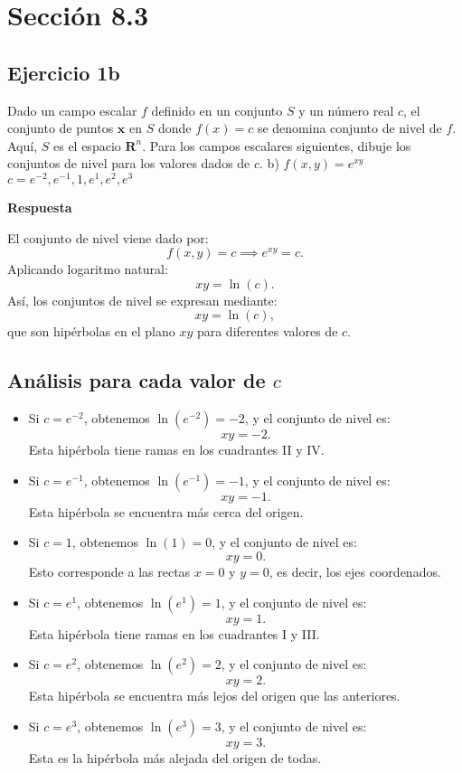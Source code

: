 \documentclass{report}
\begin{document}

    \pagebreak
    \section*{Sección 8.3}
    \subsection*{Ejercicio 1b}
    Dado un campo escalar $f$ definido en un conjunto $S$ y un número real $c$, el conjunto de puntos $\boldsymbol{x}$ en $S$ donde $f(x)=c$ se denomina conjunto de nivel de $f$. Aquí, $S$ es el espacio $\mathbf{R}^{n}$. Para los campos escalares siguientes, dibuje los conjuntos de nivel para los valores dados de $c$.
    b) $f(x, y)=e^{xy}$
    $c=e^{-2}, e^{-1}, 1, e^{1}, e^{2}, e^{3}$

    \textbf{Respuesta}

    El conjunto de nivel viene dado por:
    \[
    f(x, y) = c \implies e^{xy} = c.
    \]
    Aplicando logaritmo natural:
    \[
    xy = \ln(c).
    \]
    Así, los conjuntos de nivel se expresan mediante:
    \[
    xy = \ln(c),
    \]
    que son hipérbolas en el plano $xy$ para diferentes valores de $c$.

    \subsection*{Análisis para cada valor de $c$}

    \begin{itemize}
        \item Si $c = e^{-2}$, obtenemos $\ln(e^{-2}) = -2$, y el conjunto de nivel es:
        \[
        xy = -2.
        \]
        Esta hipérbola tiene ramas en los cuadrantes II y IV.
        
        \item Si $c = e^{-1}$, obtenemos $\ln(e^{-1}) = -1$, y el conjunto de nivel es:
        \[
        xy = -1.
        \]
        Esta hipérbola se encuentra más cerca del origen.
        
        \item Si $c = 1$, obtenemos $\ln(1) = 0$, y el conjunto de nivel es:
        \[
        xy = 0.
        \]
        Esto corresponde a las rectas $x = 0$ y $y = 0$, es decir, los ejes coordenados.
        
        \item Si $c = e^{1}$, obtenemos $\ln(e^1) = 1$, y el conjunto de nivel es:
        \[
        xy = 1.
        \]
        Esta hipérbola tiene ramas en los cuadrantes I y III.
        
        \item Si $c = e^{2}$, obtenemos $\ln(e^2) = 2$, y el conjunto de nivel es:
        \[
        xy = 2.
        \]
        Esta hipérbola se encuentra más lejos del origen que las anteriores.
        
        \item Si $c = e^{3}$, obtenemos $\ln(e^3) = 3$, y el conjunto de nivel es:
        \[
        xy = 3.
        \]
        Esta es la hipérbola más alejada del origen de todas.
    \end{itemize}
\end{document}

